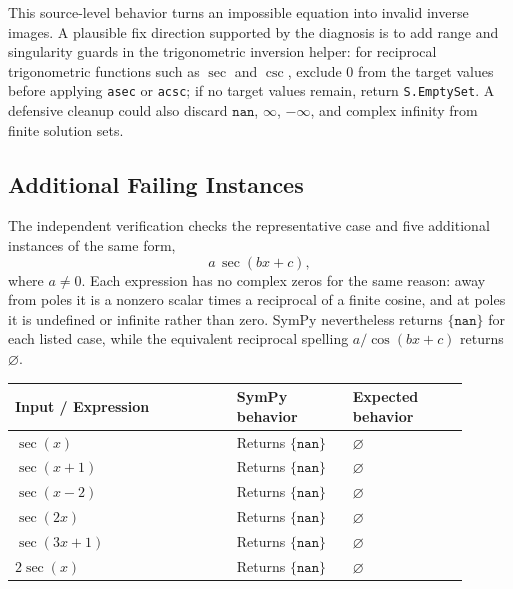 \documentclass[11pt]{article}
\begin{document}
This source-level behavior turns an impossible equation into invalid inverse
images. A plausible fix direction supported by the diagnosis is to add range and
singularity guards in the trigonometric inversion helper: for reciprocal
trigonometric functions such as \(\sec\) and \(\csc\), exclude \(0\) from the
target values before applying \texttt{asec} or \texttt{acsc}; if no target values
remain, return \texttt{S.EmptySet}. A defensive cleanup could also discard
\(\mathtt{nan}\), \(\infty\), \(-\infty\), and complex infinity from finite
solution sets.

\subsection{Additional Failing Instances}

The independent verification checks the representative case and five additional
instances of the same form,
\[
    a\,\sec(bx+c),
\]
where \(a\neq 0\). Each expression has no complex zeros for the same reason:
away from poles it is a nonzero scalar times a reciprocal of a finite cosine,
and at poles it is undefined or infinite rather than zero. SymPy nevertheless
returns \(\{\mathtt{nan}\}\) for each listed case, while the equivalent
reciprocal spelling \(a/\cos(bx+c)\) returns \(\varnothing\).

\begin{center}
\small
\renewcommand{\arraystretch}{1.3}
\begin{tabular}{@{}>{\raggedright\arraybackslash}p{0.44\linewidth}>{\raggedright\arraybackslash}p{0.23\linewidth}>{\raggedright\arraybackslash}p{0.23\linewidth}@{}}
\toprule
\textbf{Input / Expression} & \textbf{SymPy behavior} & \textbf{Expected behavior} \\
\midrule
\(\sec(x)\) & Returns \(\{\mathtt{nan}\}\) & \(\varnothing\) \\
\(\sec(x+1)\) & Returns \(\{\mathtt{nan}\}\) & \(\varnothing\) \\
\(\sec(x-2)\) & Returns \(\{\mathtt{nan}\}\) & \(\varnothing\) \\
\(\sec(2x)\) & Returns \(\{\mathtt{nan}\}\) & \(\varnothing\) \\
\(\sec(3x+1)\) & Returns \(\{\mathtt{nan}\}\) & \(\varnothing\) \\
\(2\sec(x)\) & Returns \(\{\mathtt{nan}\}\) & \(\varnothing\) \\
\bottomrule
\end{tabular}
\end{center}
\end{document}
